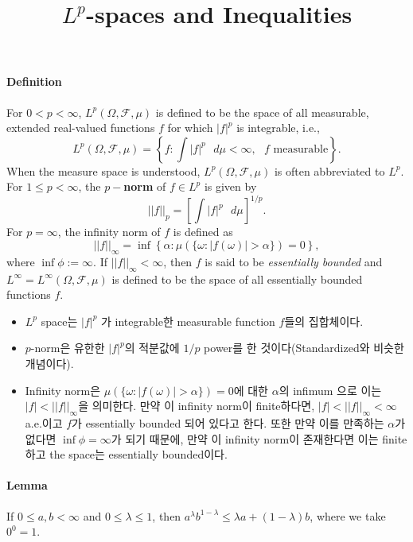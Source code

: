 \documentclass[]{article}
\title{\(L^p\)-spaces and Inequalities}
\author{}
\date{\vspace{-2.5em}}
\let\oldparagraph\paragraph
\renewcommand{\paragraph}[1]{\oldparagraph{#1}\mbox{}}
\begin{document}
\maketitle

\hypertarget{definition}{%
\paragraph{Definition}\label{definition}}

For \(0<p<\infty\), \(L^p(\Omega, \mathcal{F}, \mu)\) is defined to be
the space of all measurable, extended real-valued functions \(f\) for
which \(|f|^p\) is integrable, i.e., \[
L^p(\Omega,\mathcal{F},\mu)= \left\{f:\int |f|^p\mbox{ } d\mu<\infty,\mbox{ }f\mbox{ measurable} \right\}.
\] When the measure space is understood,
\(L^p(\Omega, \mathcal{F}, \mu)\) is often abbreviated to \(L^p\). For
\(1\le p<\infty\), the \textbf{\(p-\)norm} of \(f\in L^p\) is given by
\[
||f||_p=\left[ \int |f|^p\mbox{ } d\mu     \right]^{1/p}.
\] For \(p=\infty\), the infinity norm of \(f\) is defined as \[
||f||_\infty=\inf\left\{\alpha:\mu(\{\omega:|f(\omega)|>\alpha\})=0\right\},
\] where \(\inf\phi:=\infty\). If \(||f||_\infty<\infty\), then \(f\) is
said to be \emph{essentially bounded} and
\(L^\infty=L^\infty(\Omega, \mathcal{F},\mu)\) is defined to be the
space of all essentially bounded functions \(f\).

\begin{itemize}
\item
  \(L^p\) space는 \(|f|^p\) 가 integrable한 measurable function
  \(f\)들의 집합체이다.
\item
  \(p\)-norm은 유한한 \(|f|^p\)의 적분값에 \(1/p\) power를 한
  것이다(Standardized와 비슷한 개념이다).
\item
  Infinity norm은 \(\mu(\{\omega:|f(\omega)|>\alpha\})=0\)에 대한
  \(\alpha\)의 infimum 으로 이는 \(|f|<||f||_\infty\)을 의미한다. 만약
  이 infinity norm이 finite하다면, \(|f|<||f||_\infty<\infty\) a.e.이고
  \(f\)가 essentially bounded 되어 있다고 한다. 또한 만약 이를 만족하는
  \(\alpha\)가 없다면 \(\inf\phi=\infty\)가 되기 때문에, 만약 이
  infinity norm이 존재한다면 이는 finite하고 the space는 essentially
  bounded이다.
\end{itemize}

\hypertarget{lemma}{%
\paragraph{Lemma}\label{lemma}}

If \(0\le a,b<\infty\) and \(0\le \lambda\le 1\), then
\(a^\lambda b^{1-\lambda}\le \lambda a + (1-\lambda)b\), where we take
\(0^0=1\).
\end{document}
